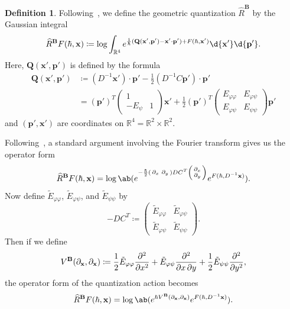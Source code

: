 \documentclass[10pt]{amsart}
\theoremstyle{definition}
\newtheorem{defn}[thm]{Definition}
\theoremstyle{remark}
\theoremstyle{plain}
\theoremstyle{definition}
\theoremstyle{remark}
\newcommand{\R}{\mathbb{R}}
\newcommand{\bB}{\mathbf{B}}
\newcommand{\bx}{\mathbf{x}}
\newcommand{\bp}{\mathbf{p}}
\newcommand{\mbf}[1]{\mathbf{#1}}
\newcommand{\wh}[1]{\widehat{#1}}
\newcommand{\1}{\mathbf{1}}
\newcommand{\2}{\mathbf{2}}
\newcommand{\3}{\mathbf{3}}
\numberwithin{equation}{section}
\begin{document}
\begin{defn}
Following~\cite{geomquantgwtheory}, we define the geometric quantization $\wh{R}^{\bB}$ by the Gaussian integral
\[ \wh{R}^{\bB}F(\hbar, \mbf{x}) \coloneqq \log \int_{\R^4} e^{\frac{1}{\hbar} ( \mbf{Q}(\bx', \bp') - \bx' \cdot \bp' ) + F(\hbar, \bx')} \d{\bx'} \d{\bp'}. \]
Here, $\mbf{Q}(\bx', \bp')$ is defined by the formula
\begin{align*}
    \mbf{Q}(\bx', \bp') &\coloneqq (D^{-1}\bx') \cdot \bp' - \frac{1}{2} (D^{-1}C \bp') \cdot \bp' \\
    &= (\bp')^T \begin{pmatrix}
        1 & \\
        -E_{\psi} & 1
    \end{pmatrix} \bx' + \frac{1}{2} (\bp')^T \begin{pmatrix}
        E_{\varphi\varphi} & E_{\varphi\psi} \\
        E_{\varphi\psi} & E_{\psi\psi}
    \end{pmatrix}\bp'
\end{align*}
and $(\bp', \bx')$ are coordinates on $\R^4 = \R^2 \times \R^2$.
\end{defn}

Following~\cite[\S 3.4]{geomquantgwtheory}, a standard argument involving the Fourier transform gives us the operator form
\[ \wh{R}^{\bB} F(\hbar, \bx) = \log \ab(e^{-\frac{\hbar}{2} \begin{psmallmatrix}
    \partial_x & \partial_y
\end{psmallmatrix}
DC^T \begin{psmallmatrix}
    \partial_x \\ \partial_y
\end{psmallmatrix}
} e^{F(\hbar, D^{-1}\bx)}). \]
Now define $\tilde{E}_{\varphi\varphi}$, $\tilde{E}_{\varphi\psi}$, and $\tilde{E}_{\psi\psi}$ by
\[ -DC^T \coloneqq \begin{pmatrix}
    \tilde{E}_{\varphi\varphi} & \tilde{E}_{\varphi\psi} \\
    \tilde{E}_{\varphi\psi} & \tilde{E}_{\psi\psi}
\end{pmatrix}.
\]
Then if we define
\[ V^{\bB}(\partial_{\bx}, \partial_{\bx}) \coloneqq \frac{1}{2} \tilde{E}_{\varphi\varphi} \pdv[order=2]{}{x} + \tilde{E}_{\varphi\psi} \pdv{}{x,y} + \frac{1}{2} \tilde{E}_{\psi\psi} \pdv[order=2]{}{y}, \]
the operator form of the quantization action becomes
\begin{equation}\label{eqn:operatorbmodel}
    \wh{R}^{\bB} F(\hbar, \bx) = \log \ab(e^{\hbar V^{\bB}(\partial_{\bx}, \partial_{\bx})} e^{F(\hbar, D^{-1}\bx)}). 
\end{equation}
\end{document}
